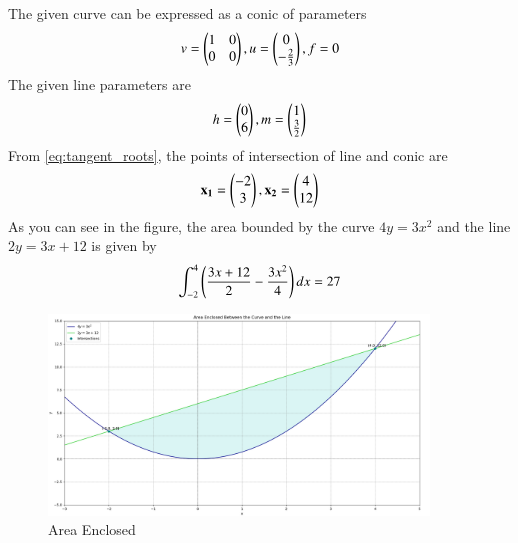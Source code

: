 \documentclass[journal]{IEEEtran}
\begin{document}
The given curve can be expressed as a conic of parameters
\begin{align}
	v=\begin{pmatrix}1&0\\0&0\end{pmatrix}, u=\begin{pmatrix}0\\-\frac{2}{3}\end{pmatrix}, f=0 
\end{align}
The given line parameters are
\begin{align}
	h=\begin{pmatrix}0\\ 6\end{pmatrix},  m=\begin{pmatrix}1\\\frac{3}{2}\end{pmatrix}
\end{align}
From \eqref{eq:tangent_roots}, the points of intersection of line and conic are
\begin{align}
	\mathbf{x_1} = \begin{pmatrix}-2\\3\end{pmatrix},  \mathbf{x_2} = \begin{pmatrix}4\\12\end{pmatrix}
\end{align}
As you can see in the figure, the area bounded by the curve $4y=3x^2$ and the line $2y=3x+12$  is given by
\begin{align}
	\int_{-2}^{4} \left(\frac{3x + 12}{2} - \frac{3x^{2}}{4}\right)dx = 27
\end{align}
\newpage
\begin{figure}[h!]
\begin{center}
	\includegraphics[width=0.9\textwidth]{figs/Figure_1.png}
	\caption{Area Enclosed}
	\label{fig:9-9.2-27 - Figure -1}
\end{center}
\end{figure}
\end{document}

